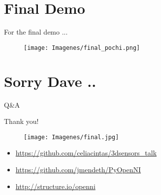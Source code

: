 \documentclass[bigger]{beamer}
\begin{document}

\section{Final Demo}
\begin{frame}{ For the final demo ...}
\begin{figure}[h]
        \texttt{[image: Imagenes/final\_pochi.png]}
\end{figure}
\end{frame}


\section{Sorry Dave ..}

\begin{frame}{ Q\&A}
\begin{center}
\begin{huge}
Thank you!
\end{huge}
\end{center}
\begin{figure}[h]
		\texttt{[image: Imagenes/final.jpg]}
\end{figure}
\begin{Small}
\begin{itemize}
    \item \url{https://github.com/celiacintas/3dsensors_talk}
    \item \url{https://github.com/jmendeth/PyOpenNI}
    \item \url{http://structure.io/openni}
\end{itemize}
\end{Small}
\end{frame}
\end{document}
